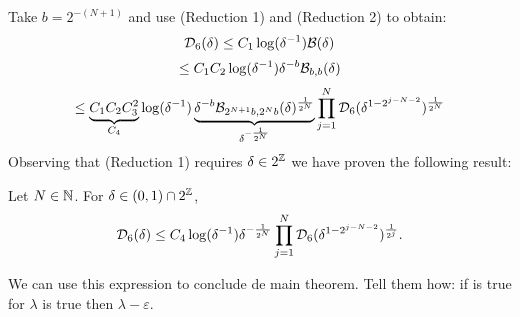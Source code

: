 Take  $b=2^{-(N+1)}$ and use (Reduction 1) and (Reduction 2) to obtain:
\begin{equation}
    \mathcal{D}_6(\delta) \leq C_1 \log(\delta^{-1})\mathcal{B}(\delta)
\end{equation}
\begin{equation}
    \leq C_1 C_2 \log(\delta^{-1})\delta^{-b} \mathcal{B}_{b,b}(\delta)
\end{equation}
\begin{equation}
    \leq  \underbrace{C_1 C_2 C_{3}^{2}}_{C_4}\log(\delta^{-1})
    \underbrace{\delta^{-b} \mathcal{B}_{2^{N+1}b,2^{N}b}(\delta)^{\frac{1}{2^{N}}}}_{\delta^{-\frac{1}{2^{N}}}}\prod_{j=1}^{N} \mathcal{D}_6(\delta^{1-2^{j-N-2}})^{\frac{1}{2^{N}}}
\end{equation}
Observing that (Reduction 1) requires $\delta \in 2^{\mathbb{Z}}$ we have proven the following result:
\begin{lem}\label{lem: general iteration}
    Let $N \in \mathbb{N}$. For $\delta \in (0,1)\cap 2^{\mathbb{Z}}$,
    \begin{equation}\label{eq:pre std.decou.}
     \mathcal{D}_6(\delta)\leq  C_4 \log(\delta^{-1})
    \delta^{-\frac{1}{2^{N}}}\prod_{j=1}^{N} \mathcal{D}_6(\delta^{1-2^{j-N-2}})^{\frac{1}{2^{j}}}.
    \end{equation}
\end{lem}
\begin{rmk}
    We can use this expression to conclude de main theorem. Tell them how: if is true for $\lambda$ is true then $\lambda -\varepsilon$.
\end{rmk}

